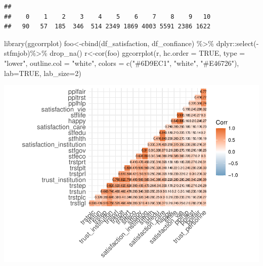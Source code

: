 \documentclass[
]{book}
\newenvironment{Shaded}{\begin{snugshade}}{\end{snugshade}}
\newcommand{\AttributeTok}[1]{\textcolor[rgb]{0.77,0.63,0.00}{#1}}
\newcommand{\ConstantTok}[1]{\textcolor[rgb]{0.00,0.00,0.00}{#1}}
\newcommand{\DecValTok}[1]{\textcolor[rgb]{0.00,0.00,0.81}{#1}}
\newcommand{\FunctionTok}[1]{\textcolor[rgb]{0.00,0.00,0.00}{#1}}
\newcommand{\NormalTok}[1]{#1}
\newcommand{\OtherTok}[1]{\textcolor[rgb]{0.56,0.35,0.01}{#1}}
\newcommand{\SpecialCharTok}[1]{\textcolor[rgb]{0.00,0.00,0.00}{#1}}
\newcommand{\StringTok}[1]{\textcolor[rgb]{0.31,0.60,0.02}{#1}}
\begin{document}
\begin{Shaded}
\end{Shaded}

\begin{verbatim}
## 
##    0    1    2    3    4    5    6    7    8    9   10 
##   90   57  185  346  514 2349 1869 4003 5591 2386 1622
\end{verbatim}

\begin{Shaded}
\begin{Highlighting}[]
\FunctionTok{library}\NormalTok{(ggcorrplot)}
\NormalTok{foo}\OtherTok{\textless{}{-}}\FunctionTok{cbind}\NormalTok{(df\_satisfaction, df\_confiance) }\SpecialCharTok{\%\textgreater{}\%}
\NormalTok{  dplyr}\SpecialCharTok{::}\FunctionTok{select}\NormalTok{(}\SpecialCharTok{{-}}\NormalTok{stfmjob)}\SpecialCharTok{\%\textgreater{}\%}
  \FunctionTok{drop\_na}\NormalTok{()}
\NormalTok{r}\OtherTok{\textless{}{-}}\FunctionTok{cor}\NormalTok{(foo)}
\FunctionTok{ggcorrplot}\NormalTok{(r, }\AttributeTok{hc.order =} \ConstantTok{TRUE}\NormalTok{, }\AttributeTok{type =} \StringTok{"lower"}\NormalTok{,}
   \AttributeTok{outline.col =} \StringTok{"white"}\NormalTok{,}
   \AttributeTok{colors =} \FunctionTok{c}\NormalTok{(}\StringTok{"\#6D9EC1"}\NormalTok{, }\StringTok{"white"}\NormalTok{, }\StringTok{"\#E46726"}\NormalTok{), }\AttributeTok{lab=}\ConstantTok{TRUE}\NormalTok{, }\AttributeTok{lab\_size=}\DecValTok{2}\NormalTok{)}
\end{Highlighting}
\end{Shaded}

\includegraphics{bookdown-demo_files/figure-latex/1103-1.pdf}
\end{document}
